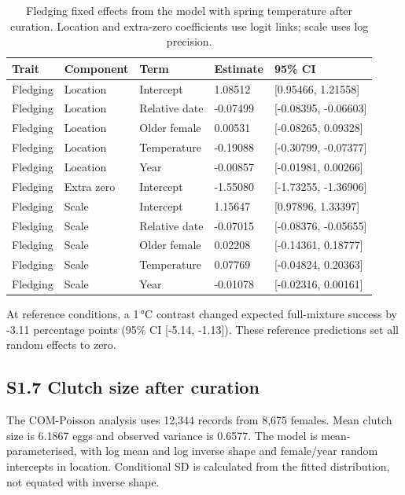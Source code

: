 \documentclass{article}
\begin{document}
\begin{table}[!ht]\centering\scriptsize\singlespacing
\caption{Fledging fixed effects from the model with spring temperature after curation. Location and extra-zero coefficients use logit links; scale uses log precision.}\label{tab:primary-ZIyear-fixed}
\begin{tabular}{lllll}\toprule
Trait & Component & Term & Estimate & 95\% CI\\\midrule
Fledging & Location & Intercept & 1.08512 & [0.95466, 1.21558]\\
Fledging & Location & Relative date & -0.07499 & [-0.08395, -0.06603]\\
Fledging & Location & Older female & 0.00531 & [-0.08265, 0.09328]\\
Fledging & Location & Temperature & -0.19088 & [-0.30799, -0.07377]\\
Fledging & Location & Year & -0.00857 & [-0.01981, 0.00266]\\
Fledging & Extra zero & Intercept & -1.55080 & [-1.73255, -1.36906]\\
Fledging & Scale & Intercept & 1.15647 & [0.97896, 1.33397]\\
Fledging & Scale & Relative date & -0.07015 & [-0.08376, -0.05655]\\
Fledging & Scale & Older female & 0.02208 & [-0.14361, 0.18777]\\
Fledging & Scale & Temperature & 0.07769 & [-0.04824, 0.20363]\\
Fledging & Scale & Year & -0.01078 & [-0.02316, 0.00161]\\
\bottomrule\end{tabular}\end{table}
At reference conditions, a 1\,\si{\degreeCelsius} contrast changed expected full-mixture success by -3.11 percentage points (95\% CI [-5.14, -1.13]). These reference predictions set all random effects to zero.

\subsection{S1.7 Clutch size after curation}

The COM-Poisson analysis uses 12,344 records from 8,675 females. Mean clutch size is 6.1867 eggs and observed variance is 0.6577. The model is mean-parameterised, with log mean and log inverse shape and female/year random intercepts in location. Conditional SD is calculated from the fitted distribution, not equated with inverse shape.
\end{document}
